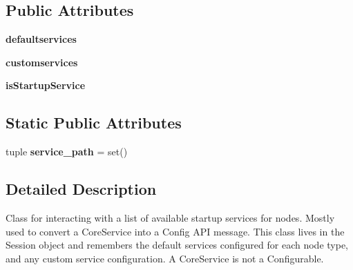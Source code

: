 \subsection*{Public Attributes}
\begin{DoxyCompactItemize}
\item 
\hypertarget{classcore_1_1service_1_1_core_services_ab7ae2696355bb60dd49644d4776523f0}{{\bfseries defaultservices}}\label{classcore_1_1service_1_1_core_services_ab7ae2696355bb60dd49644d4776523f0}

\item 
\hypertarget{classcore_1_1service_1_1_core_services_a72fc1e023599cd6e9a1e3e17850bc6e8}{{\bfseries customservices}}\label{classcore_1_1service_1_1_core_services_a72fc1e023599cd6e9a1e3e17850bc6e8}

\item 
\hypertarget{classcore_1_1service_1_1_core_services_a380287f0ef6b41d14fcb1d14cefcac27}{{\bfseries is\+Startup\+Service}}\label{classcore_1_1service_1_1_core_services_a380287f0ef6b41d14fcb1d14cefcac27}

\end{DoxyCompactItemize}
\subsection*{Static Public Attributes}
\begin{DoxyCompactItemize}
\item 
\hypertarget{classcore_1_1service_1_1_core_services_ac193dc11f76524c9fcb7246ac64ef50b}{tuple {\bfseries service\+\_\+path} = set()}\label{classcore_1_1service_1_1_core_services_ac193dc11f76524c9fcb7246ac64ef50b}

\end{DoxyCompactItemize}


\subsection{Detailed Description}
\begin{DoxyVerb}Class for interacting with a list of available startup services for
    nodes. Mostly used to convert a CoreService into a Config API
    message. This class lives in the Session object and remembers
    the default services configured for each node type, and any
    custom service configuration. A CoreService is not a Configurable.
\end{DoxyVerb}
 

